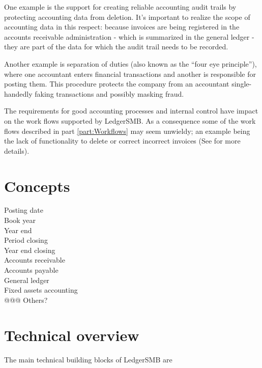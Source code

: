 One example is the support for creating reliable accounting audit trails
by protecting accounting data from deletion. It's important to realize the scope
of accounting data in this respect: because invoices are being registered in the
accounts receivable administration - which is summarized in the general ledger -
they are part of the data for which the audit trail needs to be recorded.

Another example is separation of duties (also known as the ``four eye principle''),
where one accountant enters financial transactions and another is responsible for
posting them. This procedure protects the company from an accountant single-handedly
faking transactions and possibly masking fraud.

The requirements for good accounting processes and internal control have impact
on the work flows supported by LedgerSMB. As a consequence some of the work flows
described in part \ref{part:Workflows} may seem unwieldy; an example being the
lack of functionality to delete or correct incorrect invoices (See  for more details).


\section{Concepts}

\begin{description}
\item [Posting date]
\item [Book year]
\item [Year end]
\item [Period closing]
\item [Year end closing]
\item [Accounts receivable]
\item [Accounts payable]
\item [General ledger]
\item [Fixed assets accounting]
\item [@@@ Others?]
\end{description}


\section{Technical overview}




The main technical building blocks of LedgerSMB are

